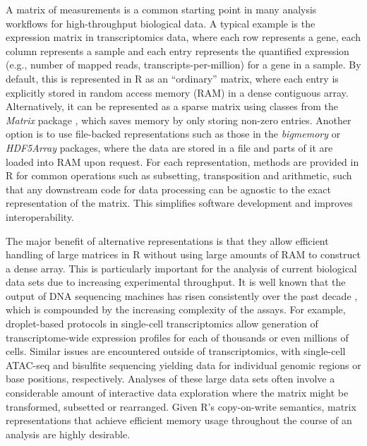 \documentclass[10pt,letterpaper]{article}
\begin{document}
A matrix of measurements is a common starting point in many analysis workflows for high-throughput biological data.
A typical example is the expression matrix in transcriptomics data, where each row represents a gene, each column represents a sample and each entry represents the quantified expression (e.g., number of mapped reads, transcripts-per-million) for a gene in a sample.
By default, this is represented in R as an ``ordinary'' matrix, where each entry is explicitly stored in random access memory (RAM) in a dense contiguous array.
Alternatively, it can be represented as a sparse matrix using classes from the \textit{Matrix} package \cite{bates2017matrix}, which saves memory by only storing non-zero entries.
Another option is to use file-backed representations such as those in the \textit{bigmemory} \cite{kane2013scalable} or \textit{HDF5Array} packages, where the data are stored in a file and parts of it are loaded into RAM upon request.
For each representation, methods are provided in R for common operations such as subsetting, transposition and arithmetic, such that any downstream code for data processing can be agnostic to the exact representation of the matrix.
This simplifies software development and improves interoperability.

The major benefit of alternative representations is that they allow efficient handling of large matrices in R without using large amounts of RAM to construct a dense array.
This is particularly important for the analysis of current biological data sets due to increasing experimental throughput.
It is well known that the output of DNA sequencing machines has risen consistently over the past decade \cite{reuter2015high}, which is compounded by the increasing complexity of the assays.
For example, droplet-based protocols in single-cell transcriptomics \cite{macosko2015highly,klein2015droplet,zheng2017massively} allow generation of transcriptome-wide expression profiles for each of thousands or even millions of cells.
Similar issues are encountered outside of transcriptomics, with single-cell ATAC-seq \cite{buenrostro2015single} and bisulfite sequencing \cite{smallwood2014single} yielding data for individual genomic regions or base positions, respectively.
Analyses of these large data sets often involve a considerable amount of interactive data exploration where the matrix might be transformed, subsetted or rearranged.
Given R's copy-on-write semantics, matrix representations that achieve efficient memory usage throughout the course of an analysis are highly desirable.
\end{document}
